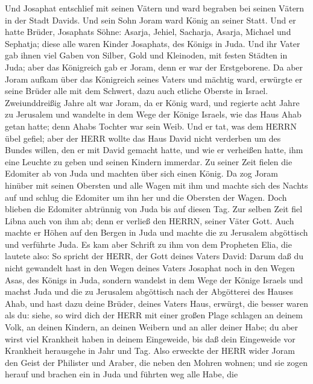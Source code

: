  Und Josaphat entschlief mit seinen Vätern und ward begraben
bei seinen Vätern in der Stadt Davids. Und sein Sohn Joram ward König an
seiner Statt.  Und er hatte Brüder, Josaphats Söhne: Asarja,
Jehiel, Sacharja, Asarja, Michael und Sephatja; diese alle waren Kinder
Josaphats, des Königs in Juda.  Und ihr Vater gab ihnen viel
Gaben von Silber, Gold und Kleinoden, mit festen Städten in Juda; aber
das Königreich gab er Joram, denn er war der Erstgeborene. 
Da aber Joram aufkam über das Königreich seines Vaters und mächtig ward,
erwürgte er seine Brüder alle mit dem Schwert, dazu auch etliche Oberste
in Israel.  Zweiunddreißig Jahre alt war Joram, da er König
ward, und regierte acht Jahre zu Jerusalem  und wandelte in
dem Wege der Könige Israels, wie das Haus Ahab getan hatte; denn Ahabs
Tochter war sein Weib. Und er tat, was dem HERRN übel gefiel;
 aber der HERR wollte das Haus David nicht verderben um des
Bundes willen, den er mit David gemacht hatte, und wie er verheißen
hatte, ihm eine Leuchte zu geben und seinen Kindern immerdar.
 Zu seiner Zeit fielen die Edomiter ab von Juda und machten
über sich einen König.  Da zog Joram hinüber mit seinen
Obersten und alle Wagen mit ihm und machte sich des Nachts auf und
schlug die Edomiter um ihn her und die Obersten der Wagen. 
Doch blieben die Edomiter abtrünnig von Juda bis auf diesen Tag. Zur
selben Zeit fiel Libna auch von ihm ab; denn er verließ den HERRN,
seiner Väter Gott.  Auch machte er Höhen auf den Bergen in
Juda und machte die zu Jerusalem abgöttisch und verführte Juda.
 Es kam aber Schrift zu ihm von dem Propheten Elia, die
lautete also: So spricht der HERR, der Gott deines Vaters David: Darum
daß du nicht gewandelt hast in den Wegen deines Vaters Josaphat noch in
den Wegen Asas, des Königs in Juda,  sondern wandelst in
dem Wege der Könige Israels und machst Juda und die zu Jerusalem
abgöttisch nach der Abgötterei des Hauses Ahab, und hast dazu deine
Brüder, deines Vaters Haus, erwürgt, die besser waren als du:
 siehe, so wird dich der HERR mit einer großen Plage
schlagen an deinem Volk, an deinen Kindern, an deinen Weibern und an
aller deiner Habe;  du aber wirst viel Krankheit haben in
deinem Eingeweide, bis daß dein Eingeweide vor Krankheit herausgehe in
Jahr und Tag.  Also erweckte der HERR wider Joram den Geist
der Philister und Araber, die neben den Mohren wohnen;  und
sie zogen herauf und brachen ein in Juda und führten weg alle Habe, die
